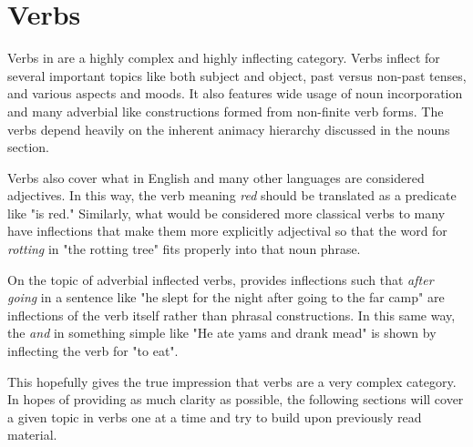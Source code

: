 \section{Verbs}
Verbs in \langname are a highly complex and highly inflecting category. Verbs inflect for several important topics like both subject and object, past versus non-past tenses, and various aspects and moods. It also features wide usage of noun incorporation and many adverbial like constructions formed from non-finite verb forms. The verbs depend heavily on the inherent animacy hierarchy discussed in the nouns section.
\par
Verbs also cover what in English and many other languages are considered adjectives. In this way, the verb meaning \textit{red} should be translated as a predicate like "is red." Similarly, what would be considered more classical verbs to many have inflections that make them more explicitly adjectival so that the word for \textit{rotting} in "the rotting tree" fits properly into that noun phrase.
\par
On the topic of adverbial inflected verbs, \langname provides inflections such that \textit{after going} in a sentence like "he slept for the night after going to the far camp" are inflections of the verb itself rather than phrasal constructions. In this same way, the \textit{and} in something simple like "He ate yams and drank mead" is shown by inflecting the verb for "to eat".
\par
This hopefully gives the true impression that verbs are a very complex category. In hopes of providing as much clarity as possible, the following sections will cover a given topic in verbs one at a time and try to build upon previously read material.

